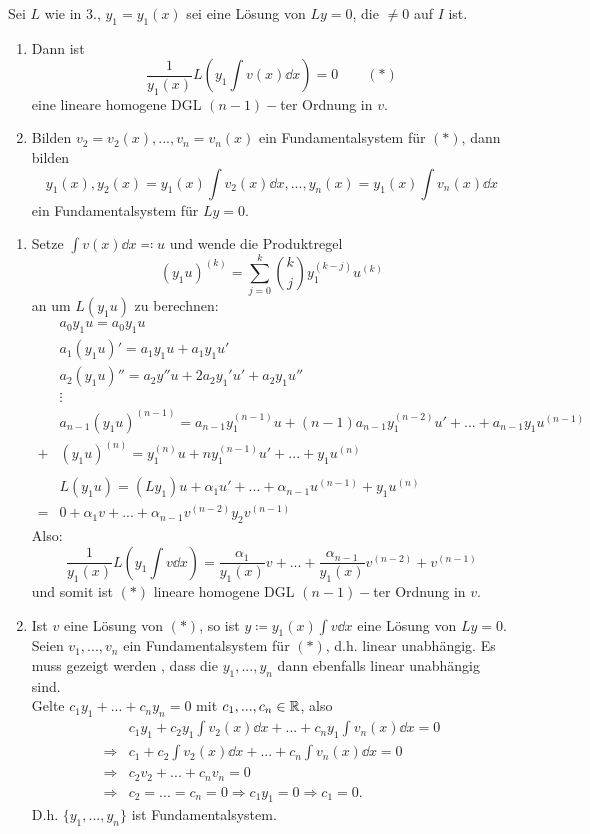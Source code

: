  \begin{satz}
 	Sei $ L $ wie in 3., $ y_1=y_1(x) $ sei eine L\"osung von $ Ly=0 $, die $ \neq 0 $ auf $ I $ ist.
 	\begin{enumerate}
 		\item Dann ist
 		\[ \frac{1}{y_1(x)}L\left(y_1\int v(x)\dd x\right)=0\qquad(\ast) \]
 		eine lineare homogene DGL $ (n-1)- $ter Ordnung in $ v $.
 		\item Bilden $ v_2=v_2(x),...,v_n=v_n(x) $ ein Fundamentalsystem f\"ur $ (\ast) $, dann bilden \[ y_1(x),y_2(x)=y_1(x)\int v_2(x)\dd x,...,y_n(x)=y_1(x)\int v_n(x)\dd x \]
 		ein Fundamentalsystem f\"ur $ Ly=0 $.
 	\end{enumerate}
 \end{satz}
 \begin{beweis}
 	\begin{enumerate}
 		\item Setze $ \int v(x)\dd x\eqqcolon u $ und wende die Produktregel
 		\[ (y_1u)^{(k)}=\sum_{j=0}^{k}\binom{k}{j}y_1^{(k-j)}u^{(k)} \]
 		an um $ L(y_1u) $ zu berechnen:
 		\begin{align*}
 		&a_0y_1 u=a_0y_1u\\
 		&a_1(y_1u)'=a_1y_1u+a_1y_1u'\\
 		&a_2(y_1u)''=a_2y''u+2a_2y_1'u'+a_2y_1u''\\
 		&\vdots\\
 		&a_{n-1}(y_1u)^{(n-1)}=a_{n-1}y_1^{(n-1)}u+(n-1)a_{n-1}y_1^{(n-2)}u'+...+a_{n-1}y_1u^{(n-1)}\\
 		+&(y_1u)^{(n)}=y_1^{(n)}u+ny_1^{(n-1)}u'+...+y_1u^{(n)}\\
 		&\\
 		&L(y_1u)=(Ly_1)u+\alpha_1u'+...+\alpha_{n-1}u^{(n-1)}+y_1u^{(n)}\\
 		=&0+\alpha_1 v+...+\alpha_{n-1}v^{(n-2)}y_2 v^{(n-1)}
 		\end{align*}
 		Also:
 		\[ \frac{1}{y_1(x)}L\left(y_1\int v\dd x\right)=\frac{\alpha_1}{y_1(x)}v+...+\frac{\alpha_{n-1}}{y_1(x)}v^{(n-2)}+v^{(n-1)} \]
 		und somit ist $ (\ast) $ lineare homogene DGL $ (n-1)- $ter Ordnung in $ v $.
 		\item Ist $ v $ eine L\"osung von $ (\ast) $, so ist $ y\coloneqq y_1(x)\int v\dd x $ eine L\"osung von $ Ly=0 $. Seien $ v_1,...,v_n $ ein Fundamentalsystem f\"ur $ (\ast) $, d.h. linear unabh\"angig. Es muss gezeigt werden , dass die $ y_1,...,y_n $ dann ebenfalls linear unabh\"angig sind.\\
 		Gelte $ c_1y_1+...+c_ny_n=0 $ mit $ c_1,...,c_n\in\mathbb{R} $, also
 		\begin{align*} &c_1y_1+c_2y_1\int v_2(x)\dd x+...+c_ny_1\int v_n(x)\dd x=0\\\Rightarrow&c_1+c_2\int v_2(x)\dd x+...+c_n\int v_n(x)\dd x=0\\
 		\Rightarrow&c_2v_2+...+c_nv_n=0\\
 		\Rightarrow&c_2=...=c_n=0\Rightarrow c_1y_1=0\Rightarrow c_1=0. \end{align*}
 		D.h. $ \lbrace y_1,...,y_n\rbrace $ ist Fundamentalsystem. 
 	\end{enumerate}
 \end{beweis}
